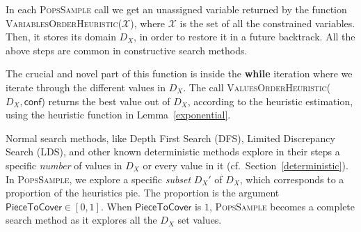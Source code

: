 \documentclass{ws-ijait}
\begin{document}
In each \textsc{PopsSample} call we get an unassigned
variable returned by the function
\textsc{VariablesOrderHeuristic}($\mathscr{X}$), where
$\mathscr{X}$ is the set of all the constrained variables.
Then, it stores its domain $D_X$, in order to restore it in
a future backtrack. All the above steps are common in
constructive search methods.

The crucial and novel part of this function is inside the
\textbf{while} iteration where we iterate through the
different values in $D_X$. The call
\textsc{ValuesOrderHeuristic}($D_X, \mathsf{conf}$) returns
the best value out of $D_X$, according to the heuristic
estimation, using the heuristic function in
Lemma~\ref{exponential}.

Normal search methods, like Depth First Search (DFS),
Limited Discrepancy Search (LDS), and other known
deterministic methods explore in their steps a specific
\emph{number} of values in $D_X$ or every value in it (cf.\ 
Section~\ref{deterministic}). In \textsc{PopsSample}, we
explore a specific \emph{subset} $D_X'$ of $D_X$, which
corresponds to a proportion of the heuristics pie. The
proportion is the argument $\mathsf{PieceToCover} \in
[0,1]$. When $\mathsf{PieceToCover}$ is $1$,
\textsc{PopsSample} becomes a complete search method as it
explores all the $D_X$ set values.
\end{document}

